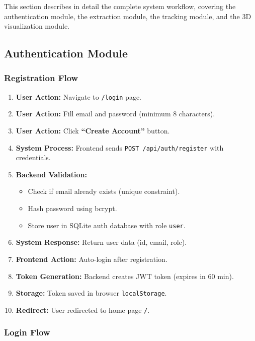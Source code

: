 \documentclass[11pt,a4paper]{article}
\begin{document}
This section describes in detail the complete system workflow, covering the authentication module, the extraction module, the tracking module, and the 3D visualization module.

\subsection{Authentication Module}

\subsubsection{Registration Flow}

\begin{enumerate}[leftmargin=*]
    \item \textbf{User Action:} Navigate to \texttt{/login} page.
    \item \textbf{User Action:} Fill email and password (minimum 8 characters).
    \item \textbf{User Action:} Click \textbf{``Create Account''} button.
    \item \textbf{System Process:} Frontend sends \texttt{POST /api/auth/register} with credentials.
    \item \textbf{Backend Validation:} 
        \begin{itemize}
            \item Check if email already exists (unique constraint).
            \item Hash password using bcrypt.
            \item Store user in SQLite auth database with role \texttt{user}.
        \end{itemize}
    \item \textbf{System Response:} Return user data (id, email, role).
    \item \textbf{Frontend Action:} Auto-login after registration.
    \item \textbf{Token Generation:} Backend creates JWT token (expires in 60 min).
    \item \textbf{Storage:} Token saved in browser \texttt{localStorage}.
    \item \textbf{Redirect:} User redirected to home page \texttt{/}.
\end{enumerate}

\subsubsection{Login Flow}
\end{document}
